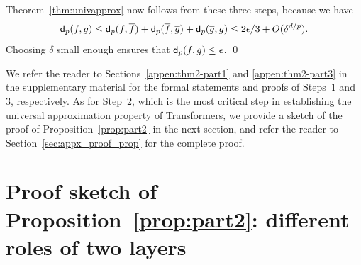 
Theorem~\ref{thm:univapprox} now follows from these three steps, because we have
\begin{equation*}
\mathsf{d}_p(f, g) \leq \mathsf{d}_p(f, \overline f) + \mathsf{d}_p(\overline f, \overline g) + \mathsf{d}_p(\overline g,g) \leq {2\epsilon}/{3} + O(\delta^{d/p}).
\end{equation*}
Choosing $\delta$ small enough ensures that $\mathsf{d}_p(f, g) \leq \epsilon$. \qed

We refer the reader to Sections~\ref{appen:thm2-part1} and \ref{appen:thm2-part3} in the supplementary material for the formal statements and proofs of Steps~$1$ and $3$, respectively. As for Step~$2$, which is the most critical step in establishing the universal approximation property of Transformers, we provide a sketch of the proof of Proposition~\ref{prop:part2} in the next section, and refer the reader to Section~\ref{sec:appx_proof_prop} for the complete proof.

\vspace*{-5pt}
\section{Proof sketch of Proposition~\ref{prop:part2}: different roles of two layers}
\vspace*{-3pt}
\label{sec:different-roles}


